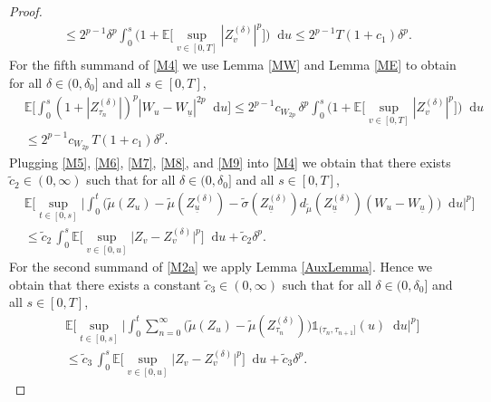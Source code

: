 \documentclass[11pt,a4paper]{article}
\numberwithin{equation}{section}
\theoremstyle{definition}
\newcommand{\E}{{\mathbb{E}}}
\newcommand{\diff}{\mathop{}\!\mathrm{d}}
\begin{document}
\begin{proof}
\begin{equation}
\begin{aligned}
    \leq 2^{p-1} \delta^p  \int_0^s\Big(1 +\E\Big[ \sup_{v\in[0,T]} |Z^{(\delta)}_{v}|^p \Big]\Big)\diff u 
    \leq 2^{p-1} T (1 +c_1) \delta^{p}.
    \end{aligned}
\end{equation}
For the fifth summand of \eqref{M4} we use Lemma \ref{MW} and Lemma \ref{ME} to obtain for all $\delta\in(0,\delta_0]$ and all $s\in[0,T]$,
\begin{equation}\label{M9}
    \begin{aligned}
    &\E\Big[ \int_0^s (1+|Z^{(\delta)}_{\tau_n}|)^p |W_u-W_{\underline u}|^{2p} \diff u\Big]
    \leq 2^{p-1} c_{W_{2p}}\, \delta^p \int_0^s \Big(1+ \E\big[\sup_{v\in[0,T]}  |Z^{(\delta)}_{v}|^p\big]\Big)  \diff u\\
    &\leq 2^{p-1} c_{W_{2p}}\, T (1+ c_1 )\delta^{p} .
    \end{aligned}
\end{equation}
Plugging \eqref{M5}, \eqref{M6}, \eqref{M7}, \eqref{M8}, and \eqref{M9} into \eqref{M4} we obtain that there exists $\widetilde c_2\in(0,\infty)$ such that for all $\delta\in(0,\delta_0]$ and all $s\in[0,T]$,
\begin{equation}\label{M10}
    \begin{aligned}
    &\E\Big[\sup_{t\in[0,s]} \Big|  \int_0^t \big(\widetilde\mu(Z_u) - \widetilde\mu(Z^{(\delta)}_{\underline u}) - \widetilde\sigma (Z^{(\delta)}_{\underline u})d_{\widetilde\mu}(Z^{(\delta)}_{\underline u})(W_u-W_{\underline u})\big) \diff u\Big|^p\Big] \\
    &\leq \widetilde c_2\, \int_0^s \E\Big[ \sup_{v\in[0,u]} \big|Z_{v} - Z^{(\delta)}_{v}\big|^p\Big]  \diff u 
    + \widetilde c_2 \delta^{p}.
    \end{aligned}
\end{equation}
For the second summand of \eqref{M2a} we apply Lemma \ref{AuxLemma}. Hence we obtain that there exists a constant $\widetilde c_3 \in(0,\infty)$ such that for all $\delta\in(0,\delta_0]$ and all $s\in[0,T]$,
\begin{equation}\label{M2}
    \begin{aligned}
    &\E\Big[\sup_{t\in[0,s]} \Big|  \int_0^t \sum_{n=0}^{\infty} \big(\widetilde\mu(Z_u) - \widetilde\mu(Z^{(\delta)}_{\tau_n})\big) \mathds{1}_{(\tau_n,\tau_{n+1}]}(u) \diff u\Big|^p\Big]\\
    &\leq \widetilde c_3\, \int_0^s \E\Big[ \sup_{v\in[0,u]} \big|Z_{v} - Z^{(\delta)}_{v}\big|^p\Big]  \diff u 
    + \widetilde c_3 \delta^{p}.
    \end{aligned}

\end{equation}
\end{proof}
\end{document}
